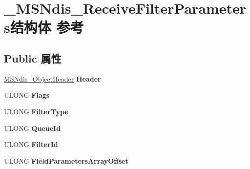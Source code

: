 \hypertarget{struct___m_s_ndis___receive_filter_parameters}{}\section{\+\_\+\+M\+S\+Ndis\+\_\+\+Receive\+Filter\+Parameters结构体 参考}
\label{struct___m_s_ndis___receive_filter_parameters}
\subsection*{Public 属性}
\begin{DoxyCompactItemize}
\item 
\mbox{\label{struct___m_s_ndis___receive_filter_parameters_a2c5ed7fe9d4acec948881f601e7e1e05}} 
\hyperlink{struct___m_s_ndis___object_header}{M\+S\+Ndis\+\_\+\+Object\+Header} {\bfseries Header}
\item 
\mbox{\label{struct___m_s_ndis___receive_filter_parameters_a57d4f35ea47c71b7006bb068b42c57ad}} 
U\+L\+O\+NG {\bfseries Flags}
\item 
\mbox{\label{struct___m_s_ndis___receive_filter_parameters_ab1a2f4f2afe870a06da6c88108e479fc}} 
U\+L\+O\+NG {\bfseries Filter\+Type}
\item 
\mbox{\label{struct___m_s_ndis___receive_filter_parameters_a958213942314d20c8474bda97d57e02a}} 
U\+L\+O\+NG {\bfseries Queue\+Id}
\item 
\mbox{\label{struct___m_s_ndis___receive_filter_parameters_a583b1fa218940d971f5437ff097a59b2}} 
U\+L\+O\+NG {\bfseries Filter\+Id}
\item 
\mbox{\label{struct___m_s_ndis___receive_filter_parameters_af297415331f22e4ef3409fa6f2635bc2}} 
U\+L\+O\+NG {\bfseries Field\+Parameters\+Array\+Offset}
\item 
\mbox{\label{struct___m_s_ndis___receive_filter_parameters_ae52363a1a779603e474adaf4b1553e29}} 

\end{DoxyCompactItemize}
